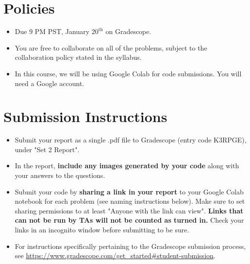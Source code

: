 \newif\ifshowsolutions
\showsolutionstrue





\pagestyle{fancy}




\section*{Policies}
\begin{itemize}
	\item Due 9 PM PST, January $20^\text{th}$ on Gradescope. 
	\item You are free to collaborate on all of the problems, subject to the collaboration policy stated in the syllabus.
	\item In this course, we will be using Google Colab for code submissions. You will need a Google account.
\end{itemize}

\section*{Submission Instructions}
\begin{itemize}
	\item Submit your report as a single .pdf file to Gradescope (entry code K3RPGE), under "Set 2 Report". 
	\item In the report, \textbf{include any images generated by your code} along with your answers to the questions.
	\item Submit your code by \textbf{sharing a link in your report} to your Google Colab notebook for each problem (see naming instructions below). Make sure to set sharing permissions to at least "Anyone with the link can view". \textbf{Links that can not be run by TAs will not be counted as turned in.} Check your links in an incognito window before submitting to be sure. 
	\item For instructions specifically pertaining to the Gradescope submission process, see \url{https://www.gradescope.com/get_started#student-submission}.
\end{itemize}

